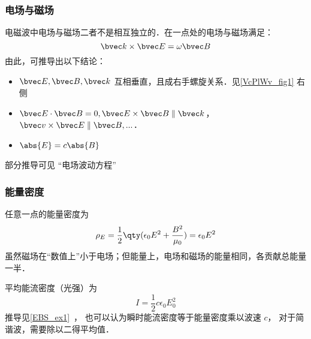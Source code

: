 \subsubsection{电场与磁场}
电磁波中电场与磁场二者不是相互独立的．在一点处的电场与磁场满足：
\begin{equation}
\bvec k \times \bvec E = \omega \bvec B
\end{equation}
由此，可推导出以下结论：
\begin{itemize}
\item $\bvec E, \bvec B, \bvec k$ 互相垂直，且成右手螺旋关系．见\autoref{VcPlWv_fig1} 右侧
\item $\bvec E \cdot \bvec B = 0,\bvec E \times \bvec B \parallel \bvec k$，$\bvec v \times \bvec E \parallel \bvec B, ...$．
\item $\abs{E}=c\abs{B}$
\end{itemize}

部分推导可见 “电场波动方程”

\subsubsection{能量密度}
任意一点的能量密度为
\begin{equation}\label{VcPlWv_eq2}
\rho_E = \frac{1}{2}\qty(\epsilon_0 E^2 + \frac{B^2}{\mu_0}) = \epsilon_0 E^2
\end{equation}
虽然磁场在“数值上”小于电场；但能量上，电场和磁场的能量相同，各贡献总能量一半． 

平均能流密度（光强）为
\begin{equation}
I = \frac12 c\epsilon_0 E_0^2
\end{equation}
推导见\autoref{EBS_ex1}~， 也可以认为瞬时能流密度等于能量密度乘以波速 $c$， 对于简谐波，需要除以二得平均值．


